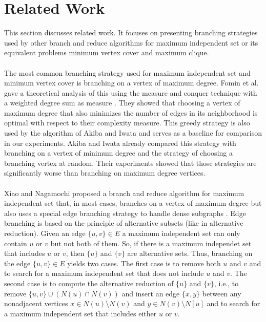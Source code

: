 \documentclass[]{article}
\begin{document}
\newpage
\section{Related Work} \label{sec3}

This section discusses related work. It focuses on presenting branching strategies used by other branch and reduce algorithms for maximum independent set or its equivalent problems minimum vertex cover and maximum clique.\paragraph{}
The most common branching strategy used for maximum independent set and minimum vertex cover is branching on a vertex of maximum degree. Fomin et al. gave a theoretical analysis of this using the measure and conquer technique with a weighted degree sum as measure \cite{Fomin}. They showed that choosing a vertex of maximum degree that also minimizes the number of edges in its neighborhood is optimal with respect to their complexity measure. This greedy strategy is also used by the algorithm of Akiba and Iwata\cite{AkibaIwata} and serves as a baseline for comparison in our experiments. Akiba and Iwata already compared this strategy with branching on a vertex of minimum degree and the strategy of choosing a branching vertex at random. Their experiments showed that those strategies are significantly worse than branching on maximum degree vertices.\paragraph{}
Xiao and Nagamochi proposed a branch and reduce algorithm for maximum independent set that, in most cases, branches on a vertex of maximum degree but also uses a special edge branching strategy to handle dense subgraphs \cite{XiaoNagamochi}. Edge branching is based on the principle of alternative subsets (like in alternative reduction). Given an edge $\{u,v\}\in E$ a maximum independent set can only contain $u$ or $v$ but not both of them. So, if there is a maximum independet set that includes $u$ or $v$, then $\{u\}$ and $\{v\}$ are alternative sets. Thus, branching on the edge $\{u,v\}\in E$ yields two cases. The first case is to remove both $u$ and $v$ and to search for a maximum independent set that does not include $u$ and $v$. The second case is to compute the alternative reduction of $\{u\}$ and $\{v\}$, i.e., to remove $\{u,v\}\cup(N(u)\cap N(v))$ and insert an edge $\{x,y\}$ between any nonadjacent vertices $x\in N(u)\setminus N(v)$ and $y\in N(v)\setminus N[u]$ and to search for a maximum independent set that includes either $u$ or $v$.\\
\end{document}
